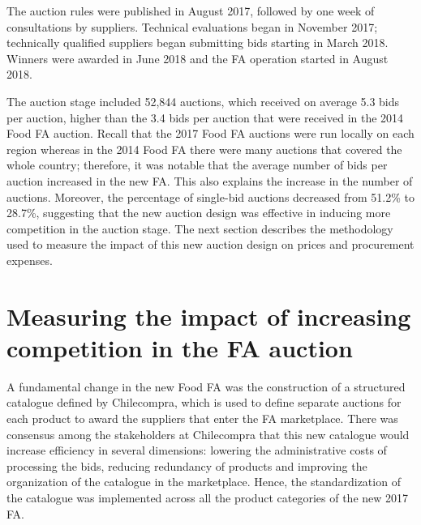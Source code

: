 The auction rules were published in August 2017, followed by one week of consultations by suppliers. Technical evaluations began in November 2017; technically qualified suppliers began submitting bids starting in March 2018. Winners were awarded in June 2018 and the FA operation started in August 2018.

The auction stage included 52,844 auctions, which received on average 5.3 bids per auction, higher than the 3.4 bids per auction that were received in the 2014 Food FA auction. Recall that the 2017 Food FA auctions were run locally on each region whereas in the 2014 Food FA there were many auctions that covered the whole country; therefore, it was notable that the average number of bids per auction increased in the new FA. {This also explains the increase in the number of auctions.} Moreover, the percentage of single-bid auctions decreased from 51.2\% to 28.7\%, suggesting that the new auction design was effective in inducing more competition in the auction stage. The next section describes the methodology used to measure the impact of this new auction design on prices and procurement expenses.



\section{Measuring the impact of increasing competition in the FA auction} \label{sec:impact}

A fundamental change in the new Food FA was the construction of a structured catalogue defined by Chilecompra, which is used to define separate auctions for each product to award the suppliers that enter the FA marketplace. There was consensus among the stakeholders at Chilecompra that this new catalogue would increase efficiency in several dimensions: lowering the administrative costs of processing the bids, reducing redundancy of products and improving the organization of the catalogue in the marketplace. Hence, the standardization of the catalogue was implemented across all the product categories of the new 2017 FA.

